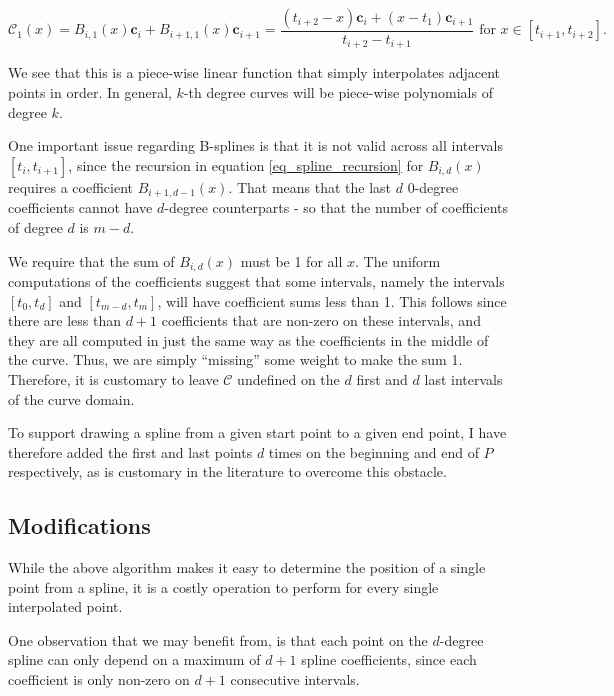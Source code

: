 \documentclass[english]{article}
\begin{document}
\[
\mathcal{C}_1(x) = B_{i,1}(x)\mathbf{c}_i + B_{i+1,1}(x)\mathbf{c}_{i + 1} = \dfrac{(t_{i + 2} - x)\mathbf{c}_i + (x - t_1)\mathbf{c}_{i + 1}}{t_{i + 2} - t_{i + 1}} \text{ for } x \in [t_{i + 1}, t_{i + 2}].
\]

We see that this is a piece-wise linear function that simply interpolates adjacent points in order. In general, $k$-th degree curves will be piece-wise polynomials of degree $k$.

One important issue regarding B-splines is that it is not valid across all intervals $[t_i, t_{i + 1}]$, since the recursion in equation \ref{eq_spline_recursion} for $B_{i,d}(x)$ requires a coefficient $B_{i + 1, d - 1}(x)$. That means that the last $d$ 0-degree coefficients cannot have $d$-degree counterparts - so that the number of coefficients of degree $d$ is $m - d$.

We require that the sum of $B_{i,d}(x)$ must be 1 for all $x$. The uniform computations of the coefficients suggest that some intervals, namely the intervals $[t_0, t_d]$ and $[t_{m-d},t_{m}]$, will have coefficient sums less than 1. This follows since there are less than $d + 1$ coefficients that are non-zero on these intervals, and they are all computed in just the same way as the coefficients in the middle of the curve. Thus, we are simply ``missing'' some weight to make the sum 1. Therefore, it is customary to leave $\mathcal{C}$ undefined on the $d$ first and $d$ last intervals of the curve domain.

To support drawing a spline from a given start point to a given end point, I have therefore added the first and last points $d$ times on the beginning and end of $P$ respectively, as is customary in the literature to overcome this obstacle.

\subsection{Modifications}

While the above algorithm makes it easy to determine the position of a single point from a spline, it is a costly operation to perform for every single interpolated point.

One observation that we may benefit from, is that each point on the $d$-degree spline can only depend on a maximum of $d + 1$ spline coefficients, since each coefficient is only non-zero on $d + 1$ consecutive intervals.
\end{document}

